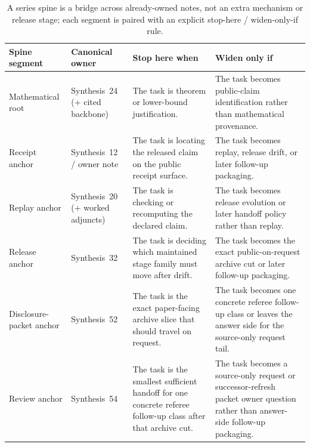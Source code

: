 \documentclass[11pt]{article}
\begin{document}
\begin{table}[t]
\centering
\small
\begin{tabularx}{\linewidth}{@{}l l X X@{}}
\toprule
Spine segment & Canonical owner & Stop here when & Widen only if \\
\midrule
Mathematical root & Synthesis~24 (+ cited backbone) & The task is theorem or lower-bound justification. & The task becomes public-claim identification rather than mathematical provenance. \\
Receipt anchor & Synthesis~12 / owner note & The task is locating the released claim on the public receipt surface. & The task becomes replay, release drift, or later follow-up packaging. \\
Replay anchor & Synthesis~20 (+ worked adjuncts) & The task is checking or recomputing the declared claim. & The task becomes release evolution or later handoff policy rather than replay. \\
Release anchor & Synthesis~32 & The task is deciding which maintained stage family must move after drift. & The task becomes the exact public-on-request archive cut or later follow-up packaging. \\
Disclosure-packet anchor & Synthesis~52 & The task is the exact paper-facing archive slice that should travel on request. & The task becomes one concrete referee follow-up class or leaves the answer side for the source-only request tail. \\
Review anchor & Synthesis~54 & The task is the smallest sufficient handoff for one concrete referee follow-up class after that archive cut. & The task becomes a source-only request or successor-refresh packet owner question rather than answer-side follow-up packaging. \\
\bottomrule
\end{tabularx}
\caption{A series spine is a bridge across already-owned notes, not an extra mechanism or release stage; each segment is paired with an explicit stop-here / widen-only-if rule.}
\label{tab:seriesspine}
\end{table}
\end{document}
